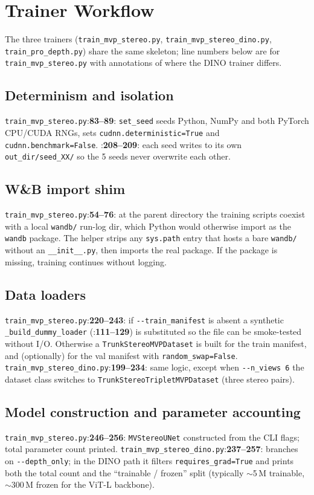 \documentclass[11pt]{article}
\newcommand{\fref}[2]{\texttt{\textcolor{filegray}{#1}}:\textbf{#2}}
\begin{document}
\section{Trainer Workflow}

The three trainers (\texttt{train\_mvp\_stereo.py},
\texttt{train\_mvp\_stereo\_dino.py}, \texttt{train\_pro\_depth.py}) share
the same skeleton; line numbers below are for
\texttt{train\_mvp\_stereo.py} with annotations of where the DINO trainer
differs.

\subsection{Determinism and isolation}
\fref{train\_mvp\_stereo.py}{83--89}: \texttt{set\_seed} seeds Python,
NumPy and both PyTorch CPU/CUDA RNGs, sets
\texttt{cudnn.deterministic=True} and \texttt{cudnn.benchmark=False}.
\fref{}{208--209}: each seed writes to its own
\texttt{out\_dir/seed\_XX/} so the 5 seeds never overwrite each other.

\subsection{W\&B import shim}
\fref{train\_mvp\_stereo.py}{54--76}: at the parent directory the
training scripts coexist with a local \texttt{wandb/} run-log dir, which
Python would otherwise import as the \texttt{wandb} package. The helper
strips any \texttt{sys.path} entry that hosts a bare \texttt{wandb/}
without an \texttt{\_\_init\_\_.py}, then imports the real package. If
the package is missing, training continues without logging.

\subsection{Data loaders}
\fref{train\_mvp\_stereo.py}{220--243}: if \texttt{-{}-train\_manifest} is
absent a synthetic \texttt{\_build\_dummy\_loader}
(\fref{}{111--129}) is substituted so the file can be smoke-tested
without I/O. Otherwise a \texttt{TrunkStereoMVPDataset} is built for the
train manifest, and (optionally) for the val manifest with
\texttt{random\_swap=False}.
\fref{train\_mvp\_stereo\_dino.py}{199--234}: same logic, except when
\texttt{-{}-n\_views 6} the dataset class switches to
\texttt{TrunkStereoTripletMVPDataset} (three stereo pairs).

\subsection{Model construction and parameter accounting}
\fref{train\_mvp\_stereo.py}{246--256}: \texttt{MVStereoUNet} constructed
from the CLI flags; total parameter count printed.
\fref{train\_mvp\_stereo\_dino.py}{237--257}: branches on
\texttt{-{}-depth\_only}; in the DINO path it filters
\texttt{requires\_grad=True} and prints both the total count and the
``trainable / frozen'' split (typically $\sim$5\,M trainable, $\sim$300\,M
frozen for the ViT-L backbone).
\end{document}
